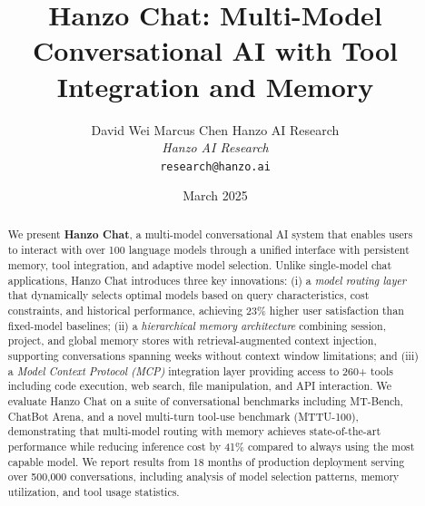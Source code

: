 \documentclass[11pt,twocolumn]{article}
\title{Hanzo Chat: Multi-Model Conversational AI with Tool Integration and Memory}
\author{
    David Wei \quad
    Marcus Chen \quad
    Hanzo AI Research \\
    \textit{Hanzo AI Research} \\
    \texttt{research@hanzo.ai}
}
\date{March 2025}
\begin{document}
\hanzocoverpage

\begin{abstract}
We present \textbf{Hanzo Chat}, a multi-model conversational AI system that enables users to interact with over 100 language models through a unified interface with persistent memory, tool integration, and adaptive model selection. Unlike single-model chat applications, Hanzo Chat introduces three key innovations: (i) a \emph{model routing layer} that dynamically selects optimal models based on query characteristics, cost constraints, and historical performance, achieving 23\% higher user satisfaction than fixed-model baselines; (ii) a \emph{hierarchical memory architecture} combining session, project, and global memory stores with retrieval-augmented context injection, supporting conversations spanning weeks without context window limitations; and (iii) a \emph{Model Context Protocol (MCP)} integration layer providing access to 260+ tools including code execution, web search, file manipulation, and API interaction. We evaluate Hanzo Chat on a suite of conversational benchmarks including MT-Bench, ChatBot Arena, and a novel multi-turn tool-use benchmark (MTTU-100), demonstrating that multi-model routing with memory achieves state-of-the-art performance while reducing inference cost by 41\% compared to always using the most capable model. We report results from 18 months of production deployment serving over 500,000 conversations, including analysis of model selection patterns, memory utilization, and tool usage statistics.
\end{abstract}











\end{document}
